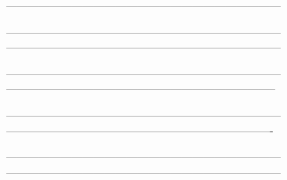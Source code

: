 \documentclass[final,11pt,a4paper,bibtotoc,idxtotoc,headsepline,footsepline,footexclude,DIV13,oneside]{scrbook}
\begin{document}
	\frontmatter
	
	
	
	
	
	
	
	
	\listoftodos
	\tableofcontents
   	

	\mainmatter
	
 ---------------------------------------------------------------------------
		
		
 ---------------------------------------------------------------------------
 ---------------------------------------------------------------------------
		
		
 ---------------------------------------------------------------------------
--------------------------------------------------------------------------
		
		
 ---------------------------------------------------------------------------
 -------------------------------------------------------------------------
		
		 ---------------------------------------------------------------------------
 ---------------------------------------------------------------------------
		
%		
		
		


  	\clearemptydoublepage
  
	
	
 
\end{document}
